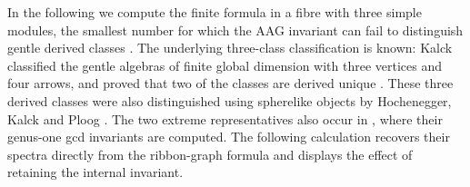 \documentclass[11pt]{amsart}
\theoremstyle{definition}
\theoremstyle{plain}
\theoremstyle{definition}
\theoremstyle{definition}
\begin{document}
In the following we compute the finite formula in a fibre with three simple modules, the
smallest number for which the AAG invariant can fail to distinguish gentle
derived classes \cite[Remark~4.4]{KalckDerivedUnique}.  The underlying
three-class classification is known: Kalck classified the
gentle algebras of finite global dimension with three vertices and four
arrows, and proved that two of the classes are derived unique
\cite[Corollary~4.7]{KalckDerivedUnique}. These three derived classes were also distinguished using spherelike
objects by Hochenegger, Kalck and Ploog
\cite[Section~1.1]{HKP2019}.  The two extreme representatives
also occur in \cite[Section~9]{AmiotPlamondonSchroll}, where their genus-one
gcd invariants are computed.  The following calculation recovers their
spectra directly from the ribbon-graph formula and displays the effect of
retaining the internal invariant.
\end{document}
